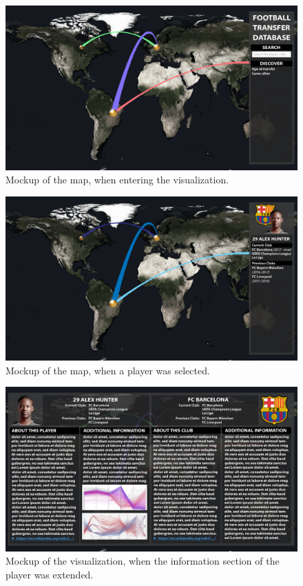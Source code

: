 \documentclass[a4paper]{tufte-book}
\begin{document}
\begin{figure}
  \includegraphics{Images/general_map.jpg}%
  \caption{Mockup of the map, when entering the visualization.}%
\end{figure}

\begin{figure}
  \includegraphics{Images/player_information.jpg}%
  \caption{Mockup of the map, when a player was selected.}%
\end{figure}

\begin{figure}
  \includegraphics{Images/player_and_club_information.jpg}%
  \caption{Mockup of the visualization, when the information section of the player was extended.}%
\end{figure}
\end{document}
